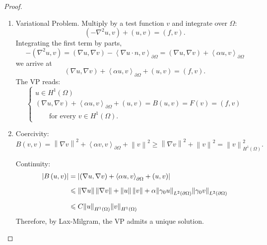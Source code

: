 \documentclass[letterpaper,twoside,11pt]{article}
\theoremstyle{mystyle}
\begin{document}
\begin{proof}
  \begin{enumerate}
    \item Variational Problem. Multiply by a test function $v$ and integrate over $\Omega$:
    \[\left( { - {\nabla ^2}u,v} \right) + \left( {u,v} \right) = \left( {f,v} \right).\]
    Integrating the first term by parts, 
    \[ - \left( {{\nabla ^2}u,v} \right) = \left( {\nabla u,\nabla v} \right) - {\left\langle {\nabla u \cdot n,v} \right\rangle _{\partial \Omega }} = \left( {\nabla u,\nabla v} \right) + {\left\langle {\alpha u,v} \right\rangle _{\partial \Omega }}\]
    we arrive at 
    \[\left( {\nabla u,\nabla v} \right) + {\left\langle {\alpha u,v} \right\rangle _{\partial \Omega }} + \left( {u,v} \right) = \left( {f,v} \right).\]
    The VP reads: 
    \[\left\{ {\begin{array}{*{20}{l}}
      {u \in {H^1}\left( \Omega  \right)} \\[.2cm] 
      {\left( {\nabla u,\nabla v} \right) + {{\left\langle {\alpha u,v} \right\rangle }_{\partial \Omega }} + \left( {u,v} \right) = B\left( {u,v} \right) = F\left( v \right) = \left( {f,v} \right)} \\[.2cm]
      \qquad \text{for every } v\in H^1 (\Omega).  
    \end{array}} \right.\]
    \item Coercivity:  
    \[B\left( {v,v} \right) = {\left\| {\nabla v} \right\|^2} + {\left\langle {\alpha v,v} \right\rangle _{\partial \Omega }} + {\left\| v \right\|^2} \geqslant {\left\| {\nabla v} \right\|^2} + {\left\| v \right\|^2} = \left\| v \right\|_{{H^1}\left( \Omega  \right)}^2.\]


    Continuity: 
    \begin{align*}
        \left| {B\left( {u,v} \right)} \right| &= \left| {\left( {\nabla u,\nabla v} \right) + {{\left\langle {\alpha u,v} \right\rangle }_{\partial \Omega }} + \left( {u,v} \right)} \right| \hfill \\[.2cm]
         &\leqslant \left\| {\nabla u} \right\|\left\| {\nabla v} \right\| + \left\| u \right\|\left\| v \right\| + \alpha {\left\| {{\gamma _0}u} \right\|_{{L^2}\left( {\partial \Omega } \right)}}{\left\| {{\gamma _0}v} \right\|_{{L^2}\left( {\partial \Omega } \right)}} \hfill \\[.2cm]
         &\leqslant C{\left\| u \right\|_{{H^1}\left( \Omega  \right)}}{\left\| v \right\|_{{H^1}\left( \Omega  \right)}}  
    \end{align*}
    Therefore, by Lax-Milgram, the VP admits a unique solution.

  \end{enumerate}
\end{proof}
\end{document}
